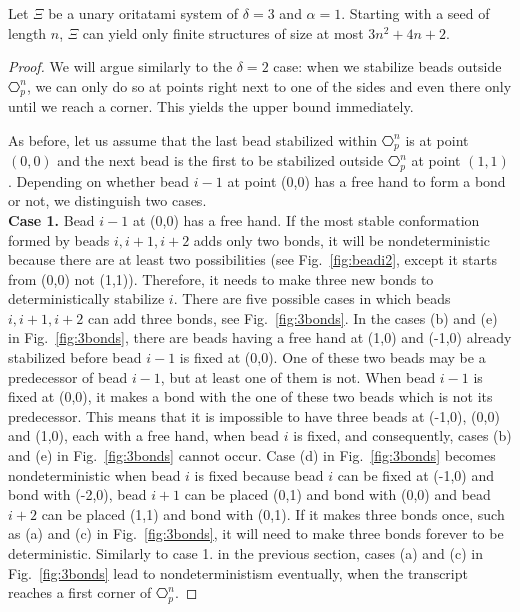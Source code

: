 \begin{lemma}[$\delta=3, \alpha =1$]\label{lem:d3a1}
	Let $\Xi$ be a unary oritatami system of $\delta=3$ and $\alpha = 1$. Starting with a seed of length $n$, $\Xi$ can yield only finite structures of size at most $3n^2+4n+2$.
\end{lemma}
\begin{proof}
We will argue similarly to the $\delta=2$ case: when we stabilize beads outside $\hexagon_p^n$, we can only do so at points right next to one of the sides and even there only until we reach a corner. This yields the upper bound immediately.

As before, let us assume that the last bead stabilized within $\hexagon_p^n$ is at point $(0,0)$ and the next bead is the first to be stabilized outside $\hexagon_p^n$ at point $(1,1)$. Depending on whether bead $i-1$ at point (0,0) has a free hand to form a bond or not, we distinguish two cases.\\
\noindent\textbf{Case 1.}  Bead $i-1$ at (0,0) has a free hand. If the most stable conformation formed by beads $i, i+1, i+2$ adds only two  bonds, it will be nondeterministic because there are at least two possibilities (see Fig.~\ref{fig:beadi2}, except it starts from (0,0) not (1,1)). Therefore, it needs to make three new bonds to deterministically stabilize $i$. There are five possible cases in which beads $i, i+1, i+2$ can add three bonds, see Fig.~\ref{fig:3bonds}. In the cases (b) and (e) in Fig.~\ref{fig:3bonds}, there are beads having a free hand at (1,0) and (-1,0) already stabilized before bead $i-1$ is fixed at (0,0). One of these two beads may be a predecessor of bead $i-1$, but at least one of them is not. When bead $i-1$ is fixed at (0,0), it makes a bond with the one of these two beads which is not its predecessor. This means that it is impossible to have three beads at (-1,0), (0,0) and (1,0), each with a free hand, when bead $i$ is fixed, and consequently, cases (b) and (e) in Fig.~\ref{fig:3bonds} cannot occur. Case (d) in Fig.~\ref{fig:3bonds} becomes nondeterministic when bead $i$ is fixed because bead $i$ can be fixed at (-1,0) and bond with (-2,0), bead $i+1$ can be placed (0,1) and bond with (0,0) and bead $i+2$ can be placed (1,1) and bond with (0,1). If it makes three bonds once, such as (a) and (c) in Fig.~\ref{fig:3bonds}, it will need to make three bonds forever to be deterministic. Similarly to case 1. in the previous section, cases (a) and (c) in Fig.~\ref{fig:3bonds} lead to nondeterministism eventually, when the transcript reaches a first corner of $\hexagon_p^n$.


\end{proof}
